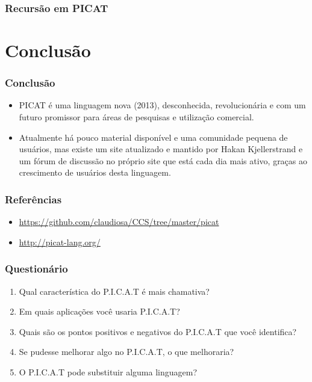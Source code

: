 \documentclass[10pt]{beamer}
\begin{document}

\begin{frame}[allowframebreaks=0.9]
 \frametitle{Recursão em PICAT}



\end{frame}



\section{Conclusão}
\begin{frame}
    \frametitle{Conclusão}
    \begin{itemize}
    \item PICAT é uma linguagem nova (2013), desconhecida, revolucionária e com um futuro promissor para áreas de pesquisas e utilização comercial.
    \item Atualmente há pouco material disponível e uma comunidade pequena de usuários, 
    mas existe um site atualizado e mantido por Hakan Kjellerstrand e um fórum de discussão no próprio site que está cada dia mais ativo, 
    graças ao crescimento de usuários desta linguagem.
    \end{itemize}
\end{frame}


\begin{frame}
    \frametitle{Referências}
    \begin{itemize}
     \item \url{https://github.com/claudiosa/CCS/tree/master/picat}
     \item \url{http://picat-lang.org/}
    \end{itemize}
\end{frame}


\begin{frame}
    \frametitle{Questionário}
    \begin{enumerate}
     \item Qual característica do P.I.C.A.T é mais chamativa?
     \item Em quais aplicações você usaria P.I.C.A.T?
     \item Quais são os pontos positivos e negativos do P.I.C.A.T que você identifica?
     \item Se pudesse melhorar algo no P.I.C.A.T, o que melhoraria?
     \item O P.I.C.A.T pode substituir alguma linguagem?
    \end{enumerate}
\end{frame}
\end{document}
